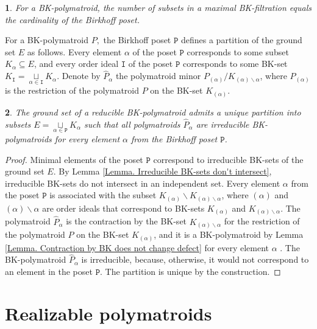 \documentclass[11pt]{article}
\theoremstyle{plain}
\newtheorem{thm}{\protect\theoremname}[section]
\theoremstyle{definition}
\theoremstyle{remark}
\theoremstyle{plain}
\theoremstyle{plain}
\theoremstyle{plain}
\newtheorem{cor}[thm]{\protect\corollaryname}
\theoremstyle{definition}
\providecommand{\corollaryname}{Corollary}
\providecommand{\theoremname}{Theorem}
\begin{document}
\begin{cor}
For a BK-polymatroid, the number of subsets in a maximal BK-filtration
equals the cardinality of the Birkhoff poset.
\end{cor}

For a BK-polymatroid $P,$ the Birkhoff poset $\mathtt{P}$ defines
a partition of the ground set $E$ as follows. Every element $\alpha$
of the poset $\mathtt{P}$ corresponds to some subset $K_{\alpha}\subseteq E$,
and every order ideal $\mathtt{I}$ of the poset $\mathtt{P}$ corresponds
to some BK-set $K_{\mathtt{I}}=\underset{\alpha\in\mathtt{I}}{\sqcup}K_{\alpha}$.
Denote by $\hat{P}_{\alpha}$ the polymatroid minor $P_{(\alpha)}/K_{(\alpha)\backslash\alpha}$,
where $P_{(\alpha)}$ is the restriction of the polymatroid $P$ on
the BK-set $K_{(\alpha)}$.
\begin{thm}
\label{Theorem. BK-partition}The ground set of a reducible BK-polymatroid
admits a unique partition into subsets $E=\underset{\alpha\in\mathtt{P}}{\sqcup}K_{\alpha}$
such that all polymatroids $\hat{P}_{\alpha}$ are irreducible BK-polymatroids
for every element $\alpha$ from the Birkhoff poset $\mathtt{P}$.
\end{thm}

\begin{proof}
Minimal elements of the poset $\mathtt{P}$ correspond to irreducible
BK-sets of the ground set $E$. By Lemma \ref{Lemma. Irreducible BK-sets don't intersect},
irreducible BK-sets do not intersect in an independent set. Every
element $\alpha$ from the poset $\mathtt{P}$ is associated with
the subset $K_{(\alpha)}\backslash K_{(\alpha)\backslash\alpha}$,
where $(\alpha)$ and $(\alpha)\backslash\alpha$ are order ideals
that correspond to BK-sets $K_{(\alpha)}$ and $K_{(\alpha)\backslash\alpha}$.
The polymatroid $\hat{P}_{\alpha}$ is the contraction by the BK-set
$K_{(\alpha)\backslash\alpha}$ for the restriction of the polymatroid
$P$ on the BK-set $K_{(\alpha)}$, and it is a BK-polymatroid by
Lemma \ref{Lemma. Contraction by BK does not change defect} for every
element $\alpha$ . The BK-polymatroid $\hat{P}_{\alpha}$ is irreducible,
because, otherwise, it would not correspond to an element in the poset
$\mathtt{P}$. The partition is unique by the construction.
\end{proof}

\section{Realizable polymatroids}
\end{document}
